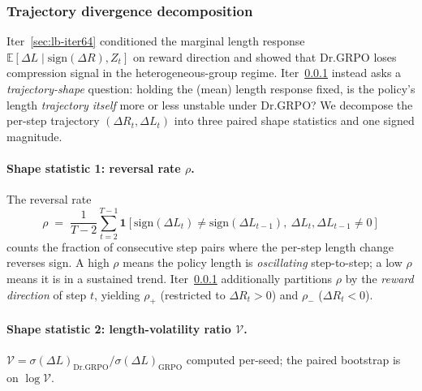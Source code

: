 
\subsubsection{Trajectory divergence decomposition}\label{sec:lb-iter68}

Iter~\ref{sec:lb-iter64} conditioned the marginal length response
$\mathbb{E}[\Delta L \mid \mathrm{sign}(\Delta R), Z_t]$ on reward direction
and showed that Dr.GRPO loses compression signal in the
heterogeneous-group regime. Iter~\ref{sec:lb-iter68} instead asks a
\emph{trajectory-shape} question: holding the (mean) length response
fixed, is the policy's length \emph{trajectory itself} more or less
unstable under Dr.GRPO? We decompose the per-step trajectory
$(\Delta R_t, \Delta L_t)$ into three paired shape statistics and one
signed magnitude.

\paragraph{Shape statistic 1: reversal rate $\rho$.}
The reversal rate
\begin{equation}\label{eq:lb68-rho}
\rho \;=\; \frac{1}{T-2}\sum_{t=2}^{T-1}
\mathbf{1}\!\left[\mathrm{sign}(\Delta L_t) \neq \mathrm{sign}(\Delta L_{t-1}),\ \Delta L_t, \Delta L_{t-1} \neq 0\right]
\end{equation}
counts the fraction of consecutive step pairs where the per-step length
change reverses sign. A high $\rho$ means the policy length is
\emph{oscillating} step-to-step; a low $\rho$ means it is in a sustained
trend. Iter~\ref{sec:lb-iter68} additionally partitions $\rho$ by the
\emph{reward direction} of step $t$, yielding $\rho_{+}$ (restricted to
$\Delta R_t > 0$) and $\rho_{-}$ ($\Delta R_t < 0$).

\paragraph{Shape statistic 2: length-volatility ratio $\mathcal{V}$.}
$\mathcal{V} = \sigma(\Delta L)_\mathrm{Dr.GRPO} / \sigma(\Delta L)_\mathrm{GRPO}$
computed per-seed; the paired bootstrap is on $\log \mathcal{V}$.

